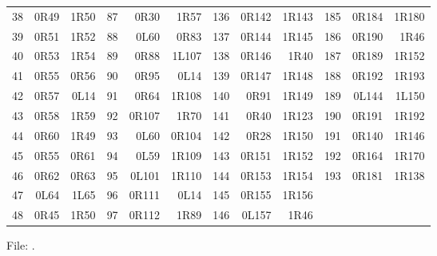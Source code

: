 \begin{center}
\begin{tabular}{rrr@{\hspace{7mm}}rrr@{\hspace{7mm}}rrr@{\hspace{7mm}}rrr}
38 & 0R49 & 1R50 & 87 & 0R30 & 1R57 & 136 & 0R142 & 1R143 & 185 & 0R184 & 1R180 \\
39 & 0R51 & 1R52 & 88 & 0L60 & 0R83 & 137 & 0R144 & 1R145 & 186 & 0R190 & 1R46 \\
40 & 0R53 & 1R54 & 89 & 0R88 & 1L107 & 138 & 0R146 & 1R40 & 187 & 0R189 & 1R152 \\
41 & 0R55 & 0R56 & 90 & 0R95 & 0L14 & 139 & 0R147 & 1R148 & 188 & 0R192 & 1R193 \\
42 & 0R57 & 0L14 & 91 & 0R64 & 1R108 & 140 & 0R91 & 1R149 & 189 & 0L144 & 1L150 \\
43 & 0R58 & 1R59 & 92 & 0R107 & 1R70 & 141 & 0R40 & 1R123 & 190 & 0R191 & 1R192 \\
44 & 0R60 & 1R49 & 93 & 0L60 & 0R104 & 142 & 0R28 & 1R150 & 191 & 0R140 & 1R146 \\
45 & 0R55 & 0R61 & 94 & 0L59 & 1R109 & 143 & 0R151 & 1R152 & 192 & 0R164 & 1R170 \\
46 & 0R62 & 0R63 & 95 & 0L101 & 1R110 & 144 & 0R153 & 1R154 & 193 & 0R181 & 1R138 \\
47 & 0L64 & 1L65 & 96 & 0R111 & 0L14 & 145 & 0R155 & 1R156 &  &  &  \\
48 & 0R45 & 1R50 & 97 & 0R112 & 1R89 & 146 & 0L157 & 1R46 &  &  &  \\
\bottomrule
\end{tabular}
\end{center}
\endgroup
\noindent File: .
